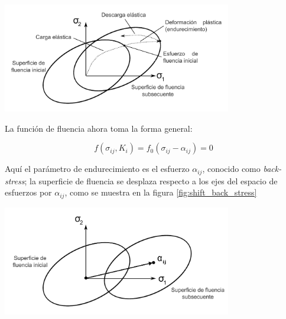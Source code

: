 \begin{center}
\includegraphics[width=0.75\textwidth]{src/ch2/kinematic_hardening}
\label{fig:kinematic_hardening}
\end{center}

La función de fluencia ahora toma la forma general:

\begin{equation}
f(\sigma_{ij}, K_i) = f_0 (\sigma_{ij} - \alpha_{ij}) = 0
\end{equation}

Aquí el parámetro de endurecimiento es el esfuerzo $\alpha_{ij}$, conocido como \textit{back-stress}; 
la superficie de fluencia se desplaza respecto a los ejes del espacio de esfuerzos por $\alpha_{ij}$, 
como se muestra en la figura \ref{fig:shift_back_stress}

\begin{center}
\includegraphics[width=0.75\textwidth]{src/ch2/shift_back_stress}
\label{fig:shift_back_stress}
\end{center}




